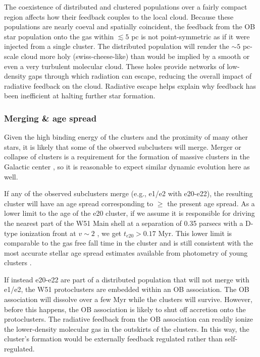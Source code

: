 The coexistence of distributed and clustered populations over a fairly compact
region affects how their feedback couples to the local cloud.  Because these
populations are nearly coeval and spatially coincident, the feedback from the
OB star population onto the gas within $\lesssim5$ pc is not point-symmetric as
if it were injected from a single cluster.  The distributed population will
render the $\sim5$ pc-scale cloud more holy (swiss-cheese-like) than would be
implied by a smooth or even a very turbulent molecular cloud.  These holes
provide networks of low-density gaps through which radiation can escape,
reducing the overall impact of radiative feedback on the cloud.  Radiative
escape helps explain why feedback has been inefficient at halting further star
formation.


\subsubsection{Merging \& age spread}
\label{sec:merging}
Given the high binding energy of the clusters and the proximity of many other
stars, it is likely that some of the observed subclusters will merge.  Merger
or collapse of clusters is a requirement for the formation of massive
clusters in the Galactic center \citep{Walker2015a}, so it is reasonable to
expect similar dynamic evolution here as well.

If any of the observed subclusters merge (e.g., e1/e2 with e20-e22), the
resulting cluster will have an age spread corresponding to $\geq$ the present
age spread.  As a lower limit to the age of the e20 cluster, if we assume it is
responsible for driving the nearest part of the W51 Main shell at a separation
of 0.35 parsecs with a D-type ionization front at $v\sim2$ \kms, we get
$t_{e20} > 0.17$ Myr.  This lower limit is comparable to the gas free fall
time in the cluster and is still consistent with the most accurate stellar age
spread estimates available from photometry of young clusters
\citep[e.g.,][]{Kudryavtseva2012a}.

If instead e20-e22 are part of a distributed population that will not merge
with e1/e2, the W51 protoclusters are embedded within an OB association.  The
OB association will dissolve over a few Myr while the clusters will survive.
However, before this happens, the OB association is likely to shut off
accretion onto the protoclusters.  The radiative feedback from the OB
association can readily ionize the lower-density molecular gas in the outskirts
of the clusters.  In this way, the cluster's formation would be externally
feedback regulated rather than self-regulated.




